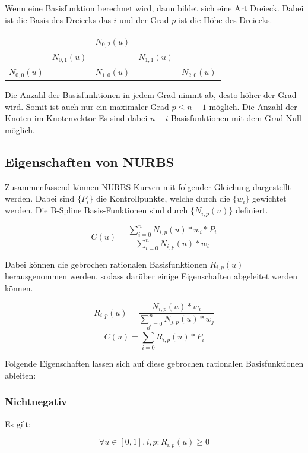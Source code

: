 \documentclass[11pt]{article}
\begin{document}
Wenn eine Basisfunktion berechnet wird, dann bildet sich eine Art Dreieck. 
Dabei ist die Basis des Dreiecks das $i$ und der Grad $p$ ist die Höhe des Dreiecks.

\begin{tabular}{c c c c c}
 &  & $N_{0,2}(u)$ &  &  \\
 & $N_{0,1}(u)$ &  & $N_{1,1}(u)$ &  \\
$N_{0,0}(u)$ &  & $N_{1,0}(u)$ &  & $N_{2,0}(u)$ \\
\end{tabular}

Die Anzahl der Basisfunktionen in jedem Grad nimmt ab, desto höher der Grad wird.
Somit ist auch nur ein maximaler Grad $p \leq n-1$ möglich.
Die Anzahl der Knoten im Knotenvektor
Es sind dabei $n-i$ Basisfunktionen mit dem Grad Null möglich.


\subsection{Eigenschaften von NURBS}
Zusammenfassend können NURBS-Kurven mit folgender Gleichung dargestellt werden. 
Dabei sind $\{P_{i}\}$ die Kontrollpunkte, welche durch die $\{w_{i}\}$ gewichtet werden.
Die B-Spline Basis-Funktionen sind durch $\{N_{i,p}(u)\}$ definiert.

\begin{equation}
C(u) = \frac{\sum_{i=0}^{n}N_{i,p}(u)*w_{i}*P_{i}}{\sum_{i=0}^{n}N_{i,p}(u)*w_{i}}
\end{equation}

Dabei können die gebrochen rationalen Basisfunktionen $R_{i,p}(u)$ herausgenommen werden, sodass darüber einige Eigenschaften abgeleitet werden können.

\begin{equation}
R_{i,p}(u) = \frac{N_{i,p}(u)*w_{i}}{\sum_{j=0}^{n}N_{j,p}(u)*w_{j}}
\end{equation}
\begin{equation}
C(u) = \sum_{i=0}^{n}R_{i,p}(u)*P_{i}
\end{equation}

Folgende Eigenschaften lassen sich auf diese gebrochen rationalen Basisfunktionen ableiten:

\subsubsection*{Nichtnegativ}
Es gilt:

\begin{equation}
\forall  u \in [0,1],  i,p : R_{i,p}(u) \geq 0
\end{equation}
\end{document}
